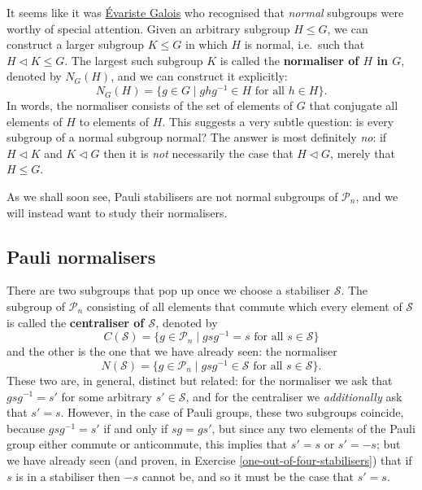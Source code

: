 \documentclass[fleqn,a4paper]{article}
\theoremstyle{definition}
\theoremstyle{definition}
\theoremstyle{definition}
\theoremstyle{definition}
\theoremstyle{remark}
\begin{document}
It seems like it was \href{https://en.wikipedia.org/wiki/Évariste_Galois}{Évariste Galois} who recognised that \emph{normal} subgroups were worthy of special attention.
Given an arbitrary subgroup \(H\leqslant G\), we can construct a larger subgroup \(K\leqslant G\) in which \(H\) is normal, i.e.~such that \(H\triangleleft K\leqslant G\).
The largest such subgroup \(K\) is called the \textbf{normaliser of \(H\) in \(G\)}, denoted by \(N_G(H)\), and we can construct it explicitly:
\[
  N_G(H) = \{g\in G \mid ghg^{-1}\in H\text{ for all }h\in H\}.
\]
In words, the normaliser consists of the set of elements of \(G\) that conjugate all elements of \(H\) to elements of \(H\).
This suggests a very subtle question: is every subgroup of a normal subgroup normal?
The answer is most definitely \emph{no}: if \(H\triangleleft K\) and \(K\triangleleft G\) then it is \emph{not} necessarily the case that \(H\triangleleft G\), merely that \(H\leqslant G\).

As we shall soon see, Pauli stabilisers are not normal subgroups of \(\mathcal{P}_n\), and we will instead want to study their normalisers.

\hypertarget{pauli-normalisers}{%
\subsection{Pauli normalisers}\label{pauli-normalisers}}

There are two subgroups that pop up once we choose a stabiliser \(\mathcal{S}\).
The subgroup of \(\mathcal{P}_n\) consisting of all elements that commute which every element of \(\mathcal{S}\) is called the \textbf{centraliser of \(\mathcal{S}\)}, denoted by
\[
  C(\mathcal{S}) = \{g\in\mathcal{P}_n \mid gsg^{-1}=s\text{ for all }s\in\mathcal{S}\}
\]
and the other is the one that we have already seen: the normaliser
\[
  N(\mathcal{S}) = \{g\in\mathcal{P}_n \mid gsg^{-1}\in\mathcal{S}\text{ for all }s\in\mathcal{S}\}.
\]
These two are, in general, distinct but related: for the normaliser we ask that \(gsg^{-1}=s'\) for some arbitrary \(s'\in\mathcal{S}\), and for the centraliser we \emph{additionally} ask that \(s'=s\).
However, in the case of Pauli groups, these two subgroups coincide, because \(gsg^{-1}=s'\) if and only if \(sg=gs'\), but since any two elements of the Pauli group either commute or anticommute, this implies that \(s'=s\) or \(s'=-s\); but we have already seen (and proven, in Exercise \ref{one-out-of-four-stabilisers}) that if \(s\) is in a stabiliser then \(-s\) cannot be, and so it must be the case that \(s'=s\).
\end{document}
